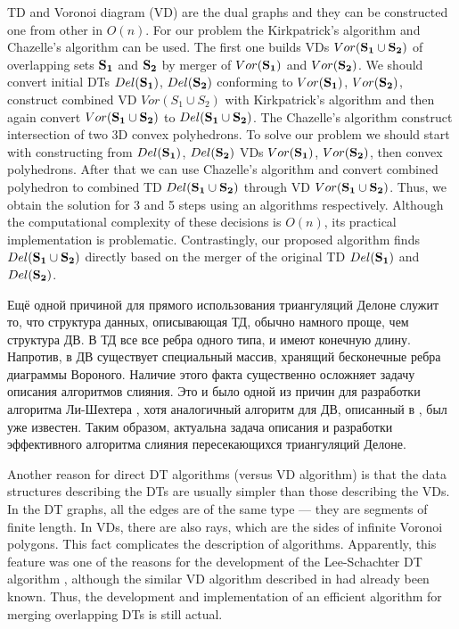 \documentclass[12pt]{article}
\begin{document}
TD and Voronoi diagram (VD) are the dual graphs and they can be constructed one from other in $O(n)$.
For our problem the Kirkpatrick's algorithm \cite{Kirkpatrick} and Chazelle's algorithm \cite{Chazelle} can be used.
The first one builds VDs $Vor(\bf{S_1} \cup \bf{S_2})$ of overlapping sets $\bf{S_1}$ and $\bf{S_2}$ by merger of $Vor(\bf{S_1})$ and $Vor(\bf{S_2})$.
We should convert initial DTs $Del(\bf{S_1})$, $Del(\bf{S_2})$ conforming to $Vor(\bf{S_1})$, $Vor(\bf{S_2})$, construct combined VD $Vor(S_1 \cup S_2)$ with Kirkpatrick's algorithm and then again convert $Vor(\bf{S_1} \cup \bf{S_2})$ to $Del(\bf{S_1} \cup \bf{S_2})$.
The Chazelle's algorithm \cite{Chazelle} construct intersection of two 3D convex polyhedrons.
To solve our problem we should start with constructing from $Del(\bf{S_1})$, $Del(\bf{S_2})$ VDs $Vor(\bf{S_1})$, $Vor(\bf{S_2})$,
then convex polyhedrons.
After that we can use Chazelle's algorithm and convert combined polyhedron to combined TD $Del(\bf{S_1} \cup \bf{S_2})$ through VD $Vor(\bf{S_1} \cup \bf{S_2})$.
Thus, we obtain the solution for 3 and 5 steps using an algorithms \cite{Kirkpatrick, Chazelle} respectively.
Although the computational complexity of these decisions is $O(n)$, its practical implementation is problematic.
Contrastingly, our proposed algorithm finds $Del(\bf{S_1} \cup\bf{S_2})$ directly based on the merger of the original TD $Del(\bf{S_1})$ and $Del(\bf{S_2})$.

{\color{green}
Ещё одной причиной для прямого использования триангуляций Делоне служит то, что структура данных, описывающая ТД, обычно намного проще, чем структура ДВ.
В ТД все все ребра одного типа, и имеют конечную длину.
Напротив, в ДВ существует специальный массив, хранящий бесконечные ребра диаграммы Вороного.
Наличие этого факта существенно осложняет задачу описания алгоритмов слияния.
Это и было одной из причин для разработки алгоритма Ли-Шехтера \cite{Lee}, хотя аналогичный алгоритм для ДВ, описанный в \cite{Shamos}, был уже известен.
Таким образом, актуальна задача описания и разработки эффективного алгоритма слияния пересекающихся триангуляций Делоне.
}

Another reason for direct DT algorithms (versus VD algorithm) is that the data structures describing the DTs are usually simpler than those describing the VDs.
In the DT graphs, all the edges are of the same type --- they are segments of finite length.
In VDs, there are also rays, which are the sides of infinite Voronoi polygons.
This fact complicates the description of algorithms.
Apparently, this feature was one of the reasons for the development of the Lee-Schachter DT algorithm \cite{Lee}, although the similar VD algorithm described in \cite{Shamos} had already been known. Thus, the development and implementation of an efficient algorithm for merging overlapping DTs is still actual.
\end{document}
